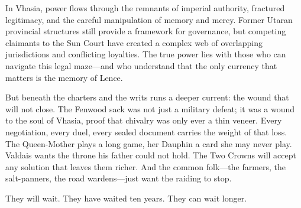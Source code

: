 \begin{tcolorbox}[colback=black!3,colframe=black!40!white,title={Patronage \& Power},breakable]
In Vhasia, power flows through the remnants of imperial authority, fractured legitimacy, and the careful manipulation of memory and mercy. Former Utaran provincial structures still provide a framework for governance, but competing claimants to the Sun Court have created a complex web of overlapping jurisdictions and conflicting loyalties. The true power lies with those who can navigate this legal maze---and who understand that the only currency that matters is the memory of Lence.

But beneath the charters and the writs runs a deeper current: the wound that will not close. The Fenwood sack was not just a military defeat; it was a wound to the soul of Vhasia, proof that chivalry was only ever a thin veneer. Every negotiation, every duel, every sealed document carries the weight of that loss. The Queen-Mother plays a long game, her Dauphin a card she may never play. Valdais wants the throne his father could not hold. The Two Crowns will accept any solution that leaves them richer. And the common folk---the farmers, the salt-panners, the road wardens---just want the raiding to stop.

They will wait. They have waited ten years. They can wait longer.


\end{tcolorbox}
